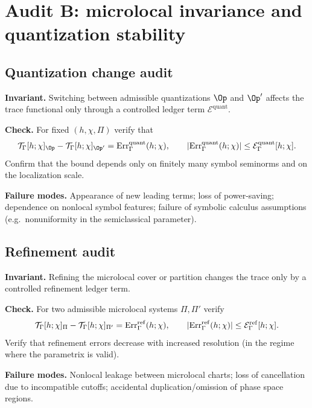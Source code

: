 \section{Audit B: microlocal invariance and quantization stability}
\label{sec:E.audit.microlocal}

\subsection{Quantization change audit}
\label{subsec:E.quantization}

\begin{audit}
\label{audit:E.B1}
\textbf{Invariant.} Switching between admissible quantizations $\Op$ and $\Op'$ affects the trace functional only
through a controlled ledger term $\mathcal{E}^{\mathrm{quant}}$.

\textbf{Check.} For fixed $(h,\chi,\Pi)$ verify that
\[
\mathcal{T}_\Gamma[h;\chi]_{\Op}
-
\mathcal{T}_\Gamma[h;\chi]_{\Op'}
=
\Err^{\mathrm{quant}}_\Gamma(h;\chi),
\qquad
|\Err^{\mathrm{quant}}_\Gamma(h;\chi)|
\le
\mathcal{E}^{\mathrm{quant}}_\Gamma[h;\chi].
\]
Confirm that the bound depends only on finitely many symbol seminorms and on the localization scale.

\textbf{Failure modes.} Appearance of new leading terms; loss of power-saving; dependence on nonlocal symbol features;
failure of symbolic calculus assumptions (e.g.\ nonuniformity in the semiclassical parameter).
\end{audit}

\subsection{Refinement audit}
\label{subsec:E.refinement}

\begin{audit}
\label{audit:E.B2}
\textbf{Invariant.} Refining the microlocal cover or partition changes the trace only by a controlled refinement
ledger term.

\textbf{Check.} For two admissible microlocal systems $\Pi,\Pi'$ verify
\[
\mathcal{T}_\Gamma[h;\chi]_{\Pi}
-
\mathcal{T}_\Gamma[h;\chi]_{\Pi'}
=
\mathrm{Err}^{\mathrm{ref}}_\Gamma(h;\chi),
\qquad
|\mathrm{Err}^{\mathrm{ref}}_\Gamma(h;\chi)|
\le
\mathcal{E}^{\mathrm{ref}}_\Gamma[h;\chi].
\]
Verify that refinement errors decrease with increased resolution (in the regime where the parametrix is valid).

\textbf{Failure modes.} Nonlocal leakage between microlocal charts; loss of cancellation due to incompatible cutoffs;
accidental duplication/omission of phase space regions.
\end{audit}

